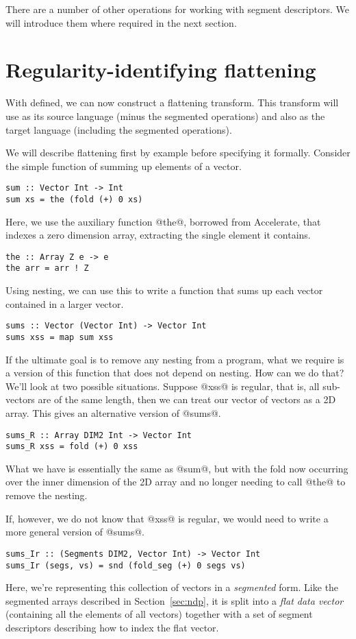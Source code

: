 There are a number of other operations for working with segment descriptors. We will introduce them where required in the next section.


\section{Regularity-identifying flattening}
\label{sec:flattening}

With \ndp{} defined, we can now construct a flattening transform. This transform will use \ndp{} as its source language (minus the segmented operations) and also as the target language (including the segmented operations).

We will describe flattening first by example before specifying it formally. Consider the simple function of summing up elements of a vector.
%
\begin{lstlisting}[style=ndp]
sum :: Vector Int -> Int
sum xs = the (fold (+) 0 xs)
\end{lstlisting}
%
Here, we use the auxiliary function @the@, borrowed from Accelerate, that indexes a zero dimension array, extracting the single element it contains.
%
\begin{lstlisting}[style=ndp]
the :: Array Z e -> e
the arr = arr ! Z
\end{lstlisting}
%
Using nesting, we can use this to write a function that sums up each vector contained in a larger vector.
%
\begin{lstlisting}[style=ndp]
sums :: Vector (Vector Int) -> Vector Int
sums xss = map sum xss
\end{lstlisting}
%
If the ultimate goal is to remove any nesting from a program, what we require is a version of this function that does not depend on nesting. How can we do that? We'll look at two possible situations. Suppose @xss@ is regular, that is, all sub-vectors are of the same length, then we can treat our vector of vectors as a 2D array. This gives an alternative version of @sums@.
%
\begin{lstlisting}[style=ndp]
sums_R :: Array DIM2 Int -> Vector Int
sums_R xss = fold (+) 0 xss
\end{lstlisting}
%
What we have is essentially the same as @sum@, but with the fold now occurring over the inner dimension of the 2D array and no longer needing to call @the@ to remove the nesting.

If, however, we do not know that @xss@ is regular, we would need to write a more general version of @sums@.
%
\begin{lstlisting}[style=ndp]
sums_Ir :: (Segments DIM2, Vector Int) -> Vector Int
sums_Ir (segs, vs) = snd (fold_seg (+) 0 segs vs)
\end{lstlisting}
%
Here, we're representing this collection of vectors in a \emph{segmented} form. Like the segmented arrays described in Section~\ref{sec:ndp}, it is split into a \emph{flat data vector} (containing all the elements of all vectors) together with a set of segment descriptors describing how to index the flat vector.

